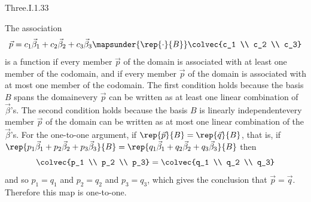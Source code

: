 \begin{ans}{Three.I.1.33}
      \begin{exparts}
        \partsitem The association
          \begin{equation*}
            \vec{p}=c_1\vec{\beta}_1+c_2\vec{\beta}_2+c_3\vec{\beta}_3
            \mapsunder{\rep{\cdot}{B}}
            \colvec{c_1 \\ c_2 \\ c_3}
          \end{equation*}
          is a function if every member $\vec{p}$ of the domain is associated
          with at least one member of the codomain, and if every member
          $\vec{p}$ of the
          domain is associated with at most one member of the codomain.
          The first condition
          holds because the basis $B$ spans the domain\Dash every
          $\vec{p}$ can be written as at least one linear combination of
          $\vec{\beta}$'s.
          The second condition holds because the basis $B$ is linearly
          independent\Dash every member $\vec{p}$
          of the domain can be written as
          at most one linear combination of the $\vec{\beta}$'s.
        \partsitem For the one-to-one argument,
          if $\rep{\vec{p}}{B}=\rep{\vec{q}}{B}$, that is, if
          \( \rep{p_1\vec{\beta}_1+p_2\vec{\beta}_2+p_3\vec{\beta}_3}{B}
             =\rep{q_1\vec{\beta}_1+q_2\vec{\beta}_2+q_3\vec{\beta}_3}{B} \)
          then
          \begin{equation*}
            \colvec{p_1 \\ p_2 \\ p_3}
            =\colvec{q_1 \\ q_2 \\ q_3}
          \end{equation*}
          and so \( p_1=q_1 \) and \( p_2=q_2 \) and \( p_3=q_3 \),
          which gives the conclusion that $\vec{p}=\vec{q}$.
          Therefore this map is one-to-one.


\end{exparts}
\end{ans}
